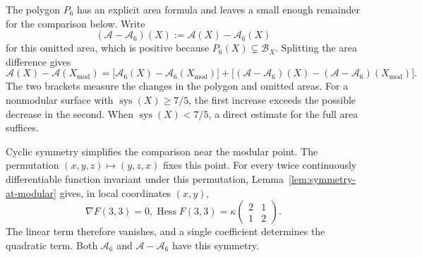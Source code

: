 \documentclass[10pt,twoside]{article}
\theoremstyle{plain}
\theoremstyle{definition}
\theoremstyle{remark}
\DeclareMathOperator{\Hess}{Hess}
\DeclareMathOperator{\sys}{sys}
\newcommand{\A}{\mathcal A}
\newcommand{\B}{\mathcal B}
\newcommand{\Xmod}{X_{\mathrm{mod}}}
\begin{document}
The polygon $P_6$ has an explicit area formula and leaves a small
enough remainder for the comparison below. Write
$$
(\A-\A_6)(X):=\A(X)-\A_6(X)
$$
for this omitted area, which is positive because
$P_6(X)\subsetneq\B_X$. Splitting the area difference gives
\begin{equation}
\label{eq:area-comparison-split}
\A(X)-\A(\Xmod)
=\bigl[\A_6(X)-\A_6(\Xmod)\bigr]
+\bigl[(\A-\A_6)(X)-(\A-\A_6)(\Xmod)\bigr].
\end{equation}
The two brackets measure the changes in the polygon and omitted
areas. For a nonmodular surface with $\sys(X)\geq7/5$, the first
increase exceeds the possible decrease in the second. When
$\sys(X)<7/5$, a direct estimate for the full area suffices.

Cyclic symmetry simplifies the comparison near the modular point.
The permutation $(x,y,z)\mapsto(y,z,x)$ fixes this point.
For every twice continuously differentiable function invariant under
this permutation, Lemma~\ref{lem:symmetry-at-modular} gives, in
local coordinates $(x,y)$,
$$
\nabla F(3,3)=0,
\Hess F(3,3)=\kappa
\begin{pmatrix}2&1\\1&2\end{pmatrix}.
$$
The linear term therefore vanishes, and a single coefficient
determines the quadratic term. Both $\A_6$ and $\A-\A_6$ have
this symmetry.
\end{document}
